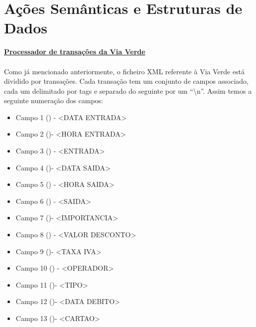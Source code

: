 \documentclass{report}
\begin{document}
\section{A\c{c}\~oes Semânticas e Estruturas de Dados}
\textbf{\underline{Processador de transa\c{c}\~oes da Via Verde}}
\\
\\
Como já mencionado anteriormente, o ficheiro XML referente à Via Verde está dividido por transa\c{c}\~oes. Cada transa\c{c}\~ao tem um conjunto de campos associado, cada um delimitado por tags e separado do seguinte por um “\textbackslash n”. Assim temos a seguinte numera\c{c}\~ao dos campos:
\\
\begin{itemize}
    \item Campo 1 () - \textless DATA ENTRADA\textgreater
    \item Campo 2 ()- \textless HORA ENTRADA\textgreater
    \item Campo 3 () - \textless ENTRADA\textgreater
    \item Campo 4 ()- \textless DATA SAIDA\textgreater
    \item Campo 5 () - \textless HORA SAIDA\textgreater
    \item Campo 6 () - \textless SAIDA\textgreater
    \item Campo 7 ()- \textless IMPORTANCIA\textgreater
    \item Campo 8 () - \textless VALOR DESCONTO\textgreater
    \item Campo 9 ()- \textless TAXA IVA\textgreater
    \item Campo 10 () - \textless OPERADOR\textgreater
    \item Campo 11 ()- \textless TIPO\textgreater
    \item Campo 12  ()- \textless DATA DEBITO\textgreater
    \item Campo 13 ()- \textless CARTAO\textgreater
\end{itemize}
\end{document}
